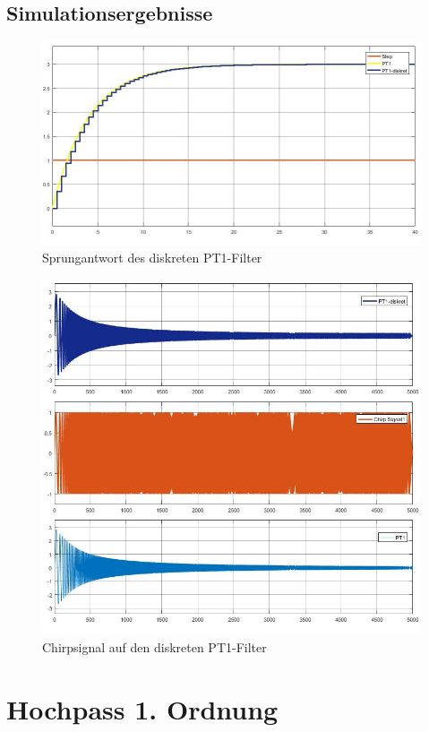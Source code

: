 \documentclass[12pt,a4paper]{report}
\begin{document}
\section{Simulationsergebnisse}
\begin{figure}[ht]
	\centering
	\includegraphics[width=0.9\linewidth]{marius/PT1_Step}
	\caption{Sprungantwort des diskreten PT1-Filter}
	\label{fig:PT1_Step}
\end{figure}
\begin{figure}[ht]
\centering
\includegraphics[width=0.9\linewidth]{marius/PT1_Chirp_0,0001-1Hz}
\caption{Chirpsignal auf den diskreten PT1-Filter}
\label{fig:PT1_Chirp}
\end{figure}




\chapter{Hochpass 1. Ordnung}
\end{document}
